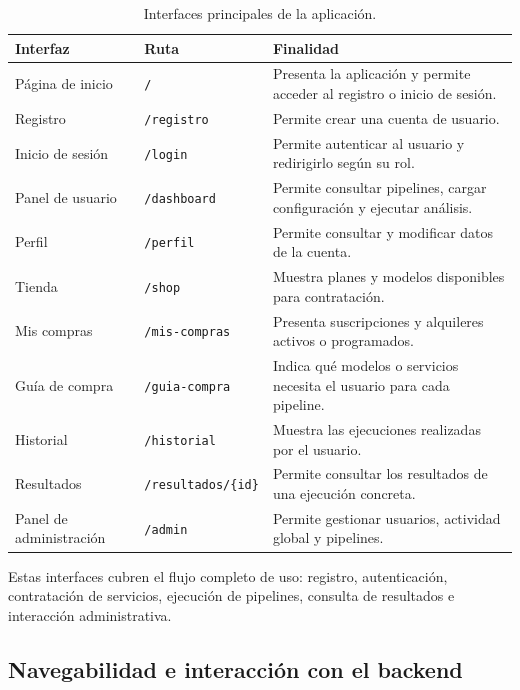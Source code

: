 \begin{table}[H]
	\centering
	\scriptsize
	\setlength{\tabcolsep}{3pt}
	\renewcommand{\arraystretch}{0.92}
	\begin{tabular}{@{}p{2.6cm}p{2.6cm}p{7.1cm}@{}}
		\toprule
		\textbf{Interfaz} & \textbf{Ruta} & \textbf{Finalidad} \\
		\midrule
		Página de inicio & \texttt{/} & Presenta la aplicación y permite acceder al registro o inicio de sesión.\\
		Registro & \texttt{/registro} & Permite crear una cuenta de usuario.\\
		Inicio de sesión & \texttt{/login} & Permite autenticar al usuario y redirigirlo según su rol.\\
		Panel de usuario & \texttt{/dashboard} & Permite consultar pipelines, cargar configuración y ejecutar análisis.\\
		Perfil & \texttt{/perfil} & Permite consultar y modificar datos de la cuenta.\\
		Tienda & \texttt{/shop} & Muestra planes y modelos disponibles para contratación.\\
		Mis compras & \texttt{/mis-compras} & Presenta suscripciones y alquileres activos o programados.\\
		Guía de compra & \texttt{/guia-compra} & Indica qué modelos o servicios necesita el usuario para cada pipeline.\\
		Historial & \texttt{/historial} & Muestra las ejecuciones realizadas por el usuario.\\
		Resultados & \texttt{/resultados/\{id\}} & Permite consultar los resultados de una ejecución concreta.\\
		Panel de administración & \texttt{/admin} & Permite gestionar usuarios, actividad global y pipelines.\\
		\bottomrule
	\end{tabular}
	\caption{Interfaces principales de la aplicación.}
	\label{tabla:interfaces_principales}
\end{table}

Estas interfaces cubren el flujo completo de uso: registro, autenticación, contratación de servicios, ejecución de pipelines, consulta de resultados e interacción administrativa.

\subsection{Navegabilidad e interacción con el backend}

